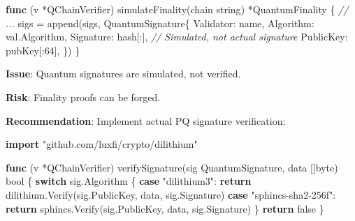 \documentclass[
]{article}
\newenvironment{Shaded}{}{}
\newcommand{\BuiltInTok}[1]{\textcolor[rgb]{0.00,0.50,0.00}{#1}}
\newcommand{\CommentTok}[1]{\textcolor[rgb]{0.38,0.63,0.69}{\textit{#1}}}
\newcommand{\ControlFlowTok}[1]{\textcolor[rgb]{0.00,0.44,0.13}{\textbf{#1}}}
\newcommand{\DataTypeTok}[1]{\textcolor[rgb]{0.56,0.13,0.00}{#1}}
\newcommand{\DecValTok}[1]{\textcolor[rgb]{0.25,0.63,0.44}{#1}}
\newcommand{\KeywordTok}[1]{\textcolor[rgb]{0.00,0.44,0.13}{\textbf{#1}}}
\newcommand{\NormalTok}[1]{#1}
\newcommand{\OperatorTok}[1]{\textcolor[rgb]{0.40,0.40,0.40}{#1}}
\newcommand{\OtherTok}[1]{\textcolor[rgb]{0.00,0.44,0.13}{#1}}
\newcommand{\StringTok}[1]{\textcolor[rgb]{0.25,0.44,0.63}{#1}}
\begin{document}
\begin{Shaded}
\begin{Highlighting}[]
\KeywordTok{func} \OperatorTok{(}\NormalTok{v }\OperatorTok{*}\NormalTok{QChainVerifier}\OperatorTok{)}\NormalTok{ simulateFinality}\OperatorTok{(}\NormalTok{chain }\DataTypeTok{string}\OperatorTok{)} \OperatorTok{*}\NormalTok{QuantumFinality }\OperatorTok{\{}
    \CommentTok{// ...}
\NormalTok{    sigs }\OperatorTok{=} \BuiltInTok{append}\OperatorTok{(}\NormalTok{sigs}\OperatorTok{,}\NormalTok{ QuantumSignature}\OperatorTok{\{}
\NormalTok{        Validator}\OperatorTok{:}\NormalTok{ name}\OperatorTok{,}
\NormalTok{        Algorithm}\OperatorTok{:}\NormalTok{ val}\OperatorTok{.}\NormalTok{Algorithm}\OperatorTok{,}
\NormalTok{        Signature}\OperatorTok{:}\NormalTok{ hash}\OperatorTok{[:],}        \CommentTok{// Simulated, not actual signature}
\NormalTok{        PublicKey}\OperatorTok{:}\NormalTok{ pubKey}\OperatorTok{[:}\DecValTok{64}\OperatorTok{],}
    \OperatorTok{\})}
\OperatorTok{\}}
\end{Highlighting}
\end{Shaded}

\textbf{Issue}: Quantum signatures are simulated, not verified.

\textbf{Risk}: Finality proofs can be forged.

\textbf{Recommendation}: Implement actual PQ signature verification:

\begin{Shaded}
\begin{Highlighting}[]
\KeywordTok{import} \StringTok{"github.com/luxfi/crypto/dilithium"}

\KeywordTok{func} \OperatorTok{(}\NormalTok{v }\OperatorTok{*}\NormalTok{QChainVerifier}\OperatorTok{)}\NormalTok{ verifySignature}\OperatorTok{(}\NormalTok{sig QuantumSignature}\OperatorTok{,}\NormalTok{ data }\OperatorTok{[]}\DataTypeTok{byte}\OperatorTok{)} \DataTypeTok{bool} \OperatorTok{\{}
    \ControlFlowTok{switch}\NormalTok{ sig}\OperatorTok{.}\NormalTok{Algorithm }\OperatorTok{\{}
    \ControlFlowTok{case} \StringTok{"dilithium3"}\OperatorTok{:}
        \ControlFlowTok{return}\NormalTok{ dilithium}\OperatorTok{.}\NormalTok{Verify}\OperatorTok{(}\NormalTok{sig}\OperatorTok{.}\NormalTok{PublicKey}\OperatorTok{,}\NormalTok{ data}\OperatorTok{,}\NormalTok{ sig}\OperatorTok{.}\NormalTok{Signature}\OperatorTok{)}
    \ControlFlowTok{case} \StringTok{"sphincs{-}sha2{-}256f"}\OperatorTok{:}
        \ControlFlowTok{return}\NormalTok{ sphincs}\OperatorTok{.}\NormalTok{Verify}\OperatorTok{(}\NormalTok{sig}\OperatorTok{.}\NormalTok{PublicKey}\OperatorTok{,}\NormalTok{ data}\OperatorTok{,}\NormalTok{ sig}\OperatorTok{.}\NormalTok{Signature}\OperatorTok{)}
    \OperatorTok{\}}
    \ControlFlowTok{return} \OtherTok{false}
\OperatorTok{\}}
\end{Highlighting}
\end{Shaded}
\end{document}
